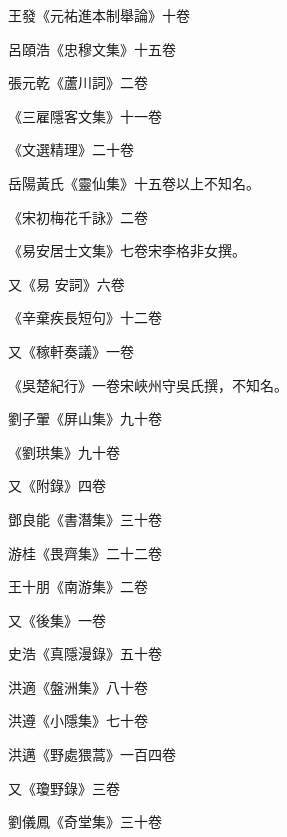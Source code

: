 \begin{pinyinscope}
 王發《元祐進本制舉論》十卷



 呂頤浩《忠穆文集》十五卷



 張元乾《蘆川詞》二卷



 《三雇隱客文集》十一卷



 《文選精理》二十卷



 岳陽黃氏《靈仙集》十五卷以上不知名。



 《宋初梅花千詠》二卷



 《易安居士文集》七卷宋李格非女撰。



 又《易
 安詞》六卷



 《辛棄疾長短句》十二卷



 又《稼軒奏議》一卷



 《吳楚紀行》一卷宋峽州守吳氏撰，不知名。



 劉子翬《屏山集》九十卷



 《劉珙集》九十卷



 又《附錄》四卷



 鄧良能《書潛集》三十卷



 游桂《畏齊集》二十二卷



 王十朋《南游集》二卷



 又《後集》一卷



 史浩《真隱漫錄》五十卷



 洪適《盤洲集》八十卷



 洪遵《小隱集》七十卷



 洪邁《野處猥蒿》一百四卷



 又《瓊野錄》三卷



 劉儀鳳《奇堂集》三十卷




\end{pinyinscope}
